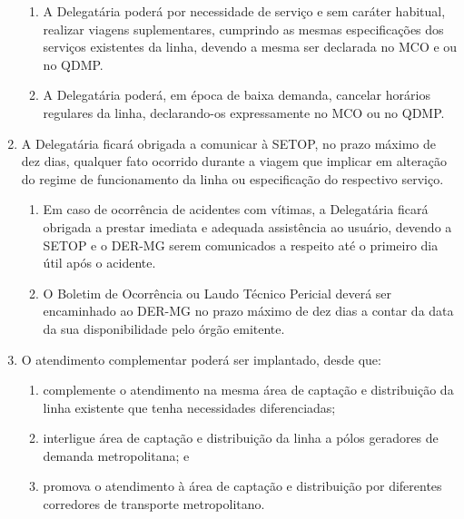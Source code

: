 \begin{enumerate}[resume, label=Art. \arabic*]
\begin{enumerate}[label= \S \arabic*] %

\item A Delegatária poderá por necessidade de serviço e sem caráter habitual, realizar viagens suplementares, cumprindo as mesmas especificações dos serviços existentes da linha, devendo a mesma ser declarada no MCO e ou no QDMP.

\item A Delegatária poderá, em época de baixa demanda, cancelar horários regulares da linha, declarando-os expressamente no MCO ou no QDMP.

\end{enumerate}

\item A Delegatária ficará obrigada a comunicar à SETOP, no prazo máximo de dez dias, qualquer fato ocorrido durante a viagem que implicar em alteração do regime de funcionamento da linha ou especificação do respectivo serviço.

\begin{enumerate}[label= \S \arabic*] %

\item Em caso de ocorrência de acidentes com vítimas, a Delegatária ficará obrigada a prestar imediata e adequada assistência ao usuário, devendo a SETOP e o DER-MG serem comunicados a respeito até o primeiro dia útil após o acidente.

\item O Boletim de Ocorrência ou Laudo Técnico Pericial deverá ser encaminhado ao DER-MG no prazo máximo de dez dias a contar da data da sua disponibilidade pelo órgão emitente.

\end{enumerate}

\item O atendimento complementar poderá ser implantado, desde que:

\begin{enumerate}[label=\roman*.]

\item complemente o atendimento na mesma área de captação e distribuição da linha existente que tenha necessidades diferenciadas;

\item interligue área de captação e distribuição da linha a pólos geradores de demanda metropolitana; e

\item promova o atendimento à área de captação e distribuição por diferentes corredores de transporte metropolitano.


\end{enumerate}
\end{enumerate}
